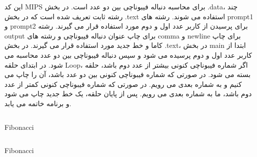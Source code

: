 {این کد MIPS برای محاسبه دنباله فیبوناچی بین دو عدد است. در بخش .data، چند رشته ثابت تعریف شده است که در بخش .text استفاده می شوند. رشته های prompt1 و prompt2 برای پرسیدن از کاربر عدد اول و دوم مورد استفاده قرار می گیرند. رشته output برای چاپ عنوان دنباله فیبوناچی و رشته های comma و newline برای چاپ کاما و خط جدید مورد استفاده قرار می گیرند. در بخش .text، در بخش main ابتدا از کاربر عدد اول و دوم پرسیده می شود و سپس دنباله فیبوناچی بین دو عدد محاسبه می شود. در ابتدای حلقه Loop، اگر شماره فیبوناچی کنونی بیشتر از عدد دوم باشد، حلقه بسته می شود. در صورتی که شماره فیبوناچی کنونی بین دو عدد باشد، آن را چاپ می کنیم و به شماره بعدی می رویم. در صورتی که شماره فیبوناچی کنونی کمتر از عدد دوم باشد، ما به شماره بعدی می رویم. پس از پایان حلقه، یک خط جدید چاپ می شود و برنامه خاتمه می یابد.}

\begin{latin}

\begin{listing}[H]
    \inputminted[linenos=true, firstline=1, lastline=50]{asm}{sources/Fibonacci.mips}
    \caption{Fibonacci}
    \label{Fibonacci-1}
\end{listing}

\begin{listing}[H]
  \inputminted[linenos=true, firstline=51, lastline=last]{asm}{sources/Fibonacci.mips}  
    \caption{Fibonacci}
    \label{Fibonacci-2}
\end{listing}

\end{latin}


